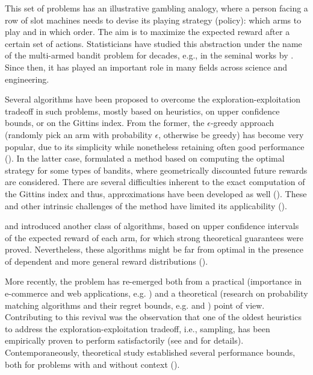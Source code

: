 \documentclass[10pt]{article}
\newcommand{\ie}{i.e., }
\newcommand{\eg}{e.g. }
\begin{document}
This set of problems has an illustrative gambling analogy, where a person facing a row of slot machines needs to devise its playing strategy (policy): which arms to play and in which order. The aim is to maximize the expected reward after a certain set of actions. Statisticians have studied this abstraction under the name of the multi-armed bandit problem for decades, e.g., in the seminal works by \cite{j-Robbins1952,j-Robbins1956}. Since then, it has played an important role in many fields across science and engineering.

Several algorithms have been proposed to overcome the exploration-exploitation tradeoff in such problems, mostly based on heuristics, on upper confidence bounds, or on the Gittins index. From the former, the $\epsilon$-greedy approach (randomly pick an arm with probability $\epsilon$, otherwise be greedy) has become very popular, due to its simplicity 
while nonetheless retaining often good performance (\cite{j-Auer2002}). In the latter case, \cite{j-Gittins1979} formulated a method based on computing the optimal strategy for some types of bandits, where geometrically discounted future rewards are considered. There are several difficulties inherent to the exact computation of the Gittins index and thus, approximations have been developed as well (\cite{j-Brezzi2002}). These and other intrinsic challenges of the method have limited its applicability (\cite{b-Sutton1998}).

\cite{j-Lai1985} and \cite{j-Lai1987} introduced another class of algorithms, based on upper confidence intervals of the expected reward of each arm, for which strong theoretical guarantees were proved. Nevertheless, these algorithms might be far from optimal in the presence of dependent and more general reward distributions (\cite{j-Scott2010}).

More recently, the problem has re-emerged both from a practical (importance in e-commerce and web applications, \eg \cite{j-Li2010}) and a theoretical (research on probability matching algorithms and their regret bounds, \eg \cite{j-Agrawal2011} and \cite{ip-Maillard2011}) point of view. Contributing to this revival was the observation that
one of the oldest heuristics to address the exploration-exploitation tradeoff, \ie \cite{j-Thompson1935,j-Thompson1933} sampling, has been empirically proven to perform satisfactorily (see \cite{ic-Chapelle2011} and \cite{j-Scott2015} for details). Contemporaneously, theoretical study established several performance bounds, both for problems with and without context (\cite{j-Agrawal2012,j-Agrawal2012a,ic-Korda2013,j-Russo2014,j-Russo2016}).
\end{document}
